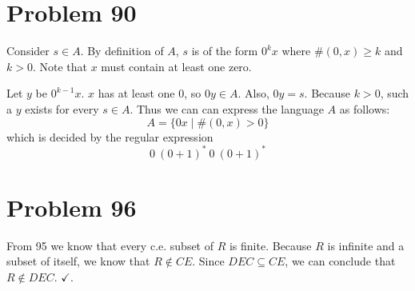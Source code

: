 \documentclass[11pt]{article}
\begin{document}
\section*{Problem 90}

Consider $s \in A$.
By definition of $A$, $s$ is of the form $0^kx$ where $\#(0,x) \geq k$ and $k>0$.
Note that $x$ must contain at least one zero.

Let $y$ be $0^{k-1}x$. $x$ has at least one 0, so $0y \in A$.
Also, $0y = s$.
Because $k >0$, such a $y$ exists for every $s \in A$.
Thus we can can express the language $A$ as follows:
	\[ A = \{0x \mid \#(0,x) > 0 \}\]
which is decided by the regular expression
	\[ 0\ (0+1)^*\ 0\ (0+1)^*\]


\section*{Problem 96}

From 95 we know that every c.e. subset of $R$ is finite.
Because $R$ is infinite and a subset of itself, we know that $R \notin CE$.
Since $DEC \subseteq CE$, we can conclude that $R \notin DEC$. $\checkmark$.
\end{document}
